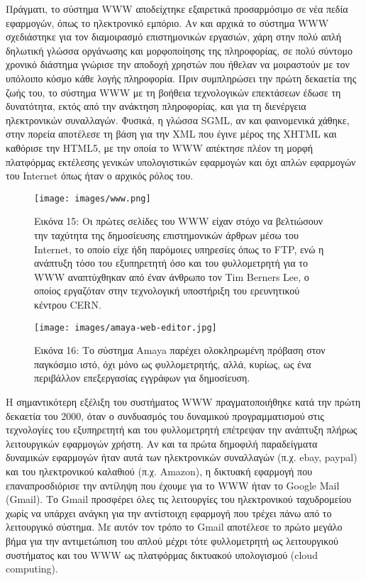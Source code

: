 \documentclass[
]{article}
\begin{document}
Πράγματι, το σύστημα WWW αποδείχτηκε εξαιρετικά προσαρμόσιμο σε νέα
πεδία εφαρμογών, όπως το ηλεκτρονικό εμπόριο. Αν και αρχικά το σύστημα
WWW σχεδιάστηκε για τον διαμοιρασμό επιστημονικών εργασιών, χάρη στην
πολύ απλή δηλωτική γλώσσα οργάνωσης και μορφοποίησης της πληροφορίας, σε
πολύ σύντομο χρονικό διάστημα γνώρισε την αποδοχή χρηστών που ήθελαν να
μοιραστούν με τον υπόλοιπο κόσμο κάθε λογής πληροφορία. Πριν συμπληρώσει
την πρώτη δεκαετία της ζωής του, το σύστημα WWW με τη βοήθεια
τεχνολογικών επεκτάσεων έδωσε τη δυνατότητα, εκτός από την ανάκτηση
πληροφορίας, και για τη διενέργεια ηλεκτρονικών συναλλαγών. Φυσικά, η
γλώσσα SGML, αν και φαινομενικά χάθηκε, στην πορεία αποτέλεσε τη βάση
για την XML που έγινε μέρος της XHTML και καθόρισε την HTML5, με την
οποία το WWW απέκτησε πλέον τη μορφή πλατφόρμας εκτέλεσης γενικών
υπολογιστικών εφαρμογών και όχι απλών εφαρμογών του Internet όπως ήταν ο
αρχικός ρόλος του.

\leavevmode{}%
\begin{figure}
\hypertarget{fig:www}{%
\centering
\texttt{[image: images/www.png]}
\caption{Εικόνα 15: Οι πρώτες σελίδες του WWW είχαν στόχο να βελτιώσουν
την ταχύτητα της δημοσίευσης επιστημονικών άρθρων μέσω του Internet, το
οποίο είχε ήδη παρόμοιες υπηρεσίες όπως το FTP, ενώ η ανάπτυξη τόσο του
εξυπηρετητή όσο και του φυλλομετρητή για το WWW αναπτύχθηκαν από έναν
άνθρωπο τον Tim Berners Lee, ο οποίος εργαζόταν στην τεχνολογική
υποστήριξη του ερευνητικού κέντρου CERN.}\label{fig:www}
}
\end{figure}

\leavevmode{}%
\begin{figure}
\hypertarget{fig:amaya-web-editor}{%
\centering
\texttt{[image: images/amaya-web-editor.jpg]}
\caption{Εικόνα 16: Το σύστημα Amaya παρέχει ολοκληρωμένη πρόβαση στον
παγκόσμιο ιστό, όχι μόνο ως φυλλομετρητής, αλλά, κυρίως, ως ένα
περιβάλλον επεξεργασίας εγγράφων για
δημοσίευση.}\label{fig:amaya-web-editor}
}
\end{figure}

Η σημαντικότερη εξέλιξη του συστήματος WWW πραγματοποιήθηκε κατά την
πρώτη δεκαετία του 2000, όταν ο συνδυασμός του δυναμικού προγραμματισμού
στις τεχνολογίες του εξυπηρετητή και του φυλλομετρητή επέτρεψαν την
ανάπτυξη πλήρως λειτουργικών εφαρμογών χρήστη. Αν και τα πρώτα δημοφιλή
παραδείγματα δυναμικών εφαρμογών ήταν αυτά των ηλεκτρονικών συναλλαγών
(π.χ. ebay, paypal) και του ηλεκτρονικού καλαθιού (π.χ. Amazon), η
δικτυακή εφαρμογή που επαναπροσδιόρισε την αντίληψη που έχουμε για το
WWW ήταν το Google Mail (Gmail). Το Gmail προσφέρει όλες τις λειτουργίες
του ηλεκτρονικού ταχυδρομείου χωρίς να υπάρχει ανάγκη για την αντίστοιχη
εφαρμογή που τρέχει πάνω από το λειτουργικό σύστημα. Με αυτόν τον τρόπο
το Gmail αποτέλεσε το πρώτο μεγάλο βήμα για την αντιμετώπιση του απλού
μέχρι τότε φυλλομετρητή ως λειτουργικού συστήματος και του WWW ως
πλατφόρμας δικτυακού υπολογισμού (cloud computing).
\end{document}
